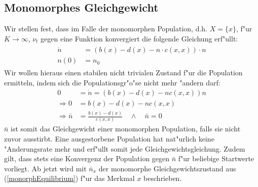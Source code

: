 \documentclass[11pt, a4paper, german]{article}
\theoremstyle{plain}
\begin{document}
	\subsection{Monomorphes Gleichgewicht}
	Wir stellen fest, dass im Falle der monomorphen Population, d.h. $ X = \{x\} $, f"ur $ K \to \infty $, $ \nu_t $ gegen eine Funktion konvergiert die folgende Gleichung erf"ullt:
	\begin{align}
	\begin{split}
		\dot{n} &= (b(x) - d(x) - n \cdot c(x,x)) \cdot n \\
		n(0) &= n_0
	\end{split}
	\end{align}
	Wir wollen hieraus einen stabilen nicht trivialen Zustand f"ur die Population ermitteln, indem sich die Populationsgr"o"se nicht mehr "andern darf:
	\begin{align}
		0 &= \dot{n} = (b(x) - d(x) - nc(x,x))n \nonumber\\
		\Rightarrow 0 &= b(x) - d(x) - nc(x,x) \nonumber\\
		\Rightarrow \bar{n} &= \frac{b(x) - d(x)}{c(x,x)} \quad \wedge \quad \bar{n} = 0 \label{monorphEquilibrium}
	\end{align}
	$ \bar{n} $ ist somit das Gleichgewicht einer monomorphen Population, falls sie nicht zuvor ausstirbt. Eine ausgestorbene Population hat nat"urlich keine "Anderungsrate mehr und erf"ullt somit jede Gleichgewichtsgleichung. Zudem gilt, dass stets eine Konvergenz der Population gegen $ \bar{n} $ f"ur beliebige Startwerte vorliegt.
	Ab jetzt wird mit $ \bar{n}_x $ der monomorphe Gleichgewichtszustand aus (\ref{monorphEquilibrium}) f"ur das Merkmal $ x $ beschrieben.
	
\end{document}
